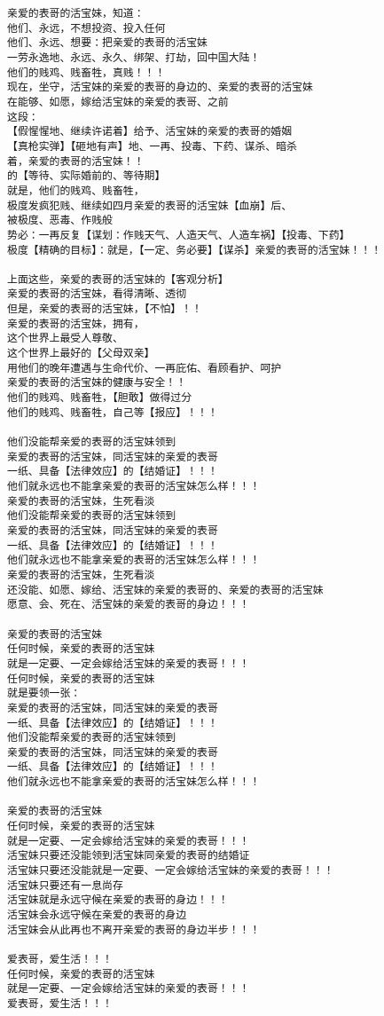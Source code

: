 \documentclass[9pt, b5paper]{article}
\begin{document}
\begin{verbatim}
亲爱的表哥的活宝妹，知道：
他们、永远，不想投资、投入任何
他们、永远、想要：把亲爱的表哥的活宝妹
一劳永逸地、永远、永久、绑架、打劫，回中国大陆！
他们的贱鸡、贱畜牲，真贱！！！
现在，坐守，活宝妹的亲爱的表哥的身边的、亲爱的表哥的活宝妹 
在能够、如愿，嫁给活宝妹的亲爱的表哥、之前
这段：
【假惺惺地、继续许诺着】给予、活宝妹的亲爱的表哥的婚姻
【真枪实弹】【砸地有声】地、一再、投毒、下药、谋杀、暗杀
着，亲爱的表哥的活宝妹！！
的【等待、实际婚前的、等待期】
就是，他们的贱鸡、贱畜牲，
极度发疯犯贱、继续如四月亲爱的表哥的活宝妹【血崩】后、
被极度、恶毒、作贱般
势必：一再反复【谋划：作贱天气、人造天气、人造车祸】【投毒、下药】
极度【精确的目标】：就是，【一定、务必要】【谋杀】亲爱的表哥的活宝妹！！！

上面这些，亲爱的表哥的活宝妹的【客观分析】
亲爱的表哥的活宝妹，看得清晰、透彻
但是，亲爱的表哥的活宝妹，【不怕】！！
亲爱的表哥的活宝妹，拥有，
这个世界上最受人尊敬、
这个世界上最好的【父母双亲】
用他们的晚年遭遇与生命代价、一再庇佑、看顾看护、呵护
亲爱的表哥的活宝妹的健康与安全！！
他们的贱鸡、贱畜牲，【胆敢】做得过分
他们的贱鸡、贱畜牲，自己等【报应】！！！

他们没能帮亲爱的表哥的活宝妹领到
亲爱的表哥的活宝妹，同活宝妹的亲爱的表哥
一纸、具备【法律效应】的【结婚证】！！！
他们就永远也不能拿亲爱的表哥的活宝妹怎么样！！！
亲爱的表哥的活宝妹，生死看淡
他们没能帮亲爱的表哥的活宝妹领到
亲爱的表哥的活宝妹，同活宝妹的亲爱的表哥
一纸、具备【法律效应】的【结婚证】！！！
他们就永远也不能拿亲爱的表哥的活宝妹怎么样！！！
亲爱的表哥的活宝妹，生死看淡
还没能、如愿、嫁给、活宝妹的亲爱的表哥的、亲爱的表哥的活宝妹
愿意、会、死在、活宝妹的亲爱的表哥的身边！！！

亲爱的表哥的活宝妹
任何时候，亲爱的表哥的活宝妹
就是一定要、一定会嫁给活宝妹的亲爱的表哥！！！
任何时候，亲爱的表哥的活宝妹
就是要领一张：
亲爱的表哥的活宝妹，同活宝妹的亲爱的表哥
一纸、具备【法律效应】的【结婚证】！！！
他们没能帮亲爱的表哥的活宝妹领到
亲爱的表哥的活宝妹，同活宝妹的亲爱的表哥
一纸、具备【法律效应】的【结婚证】！！！
他们就永远也不能拿亲爱的表哥的活宝妹怎么样！！！

亲爱的表哥的活宝妹
任何时候，亲爱的表哥的活宝妹
就是一定要、一定会嫁给活宝妹的亲爱的表哥！！！
活宝妹只要还没能领到活宝妹同亲爱的表哥的结婚证
活宝妹只要还没能就是一定要、一定会嫁给活宝妹的亲爱的表哥！！！
活宝妹只要还有一息尚存
活宝妹就是永远守候在亲爱的表哥的身边！！！
活宝妹会永远守候在亲爱的表哥的身边
活宝妹会从此再也不离开亲爱的表哥的身边半步！！！

爱表哥，爱生活！！！
任何时候，亲爱的表哥的活宝妹
就是一定要、一定会嫁给活宝妹的亲爱的表哥！！！
爱表哥，爱生活！！！
\end{verbatim}
\end{document}

